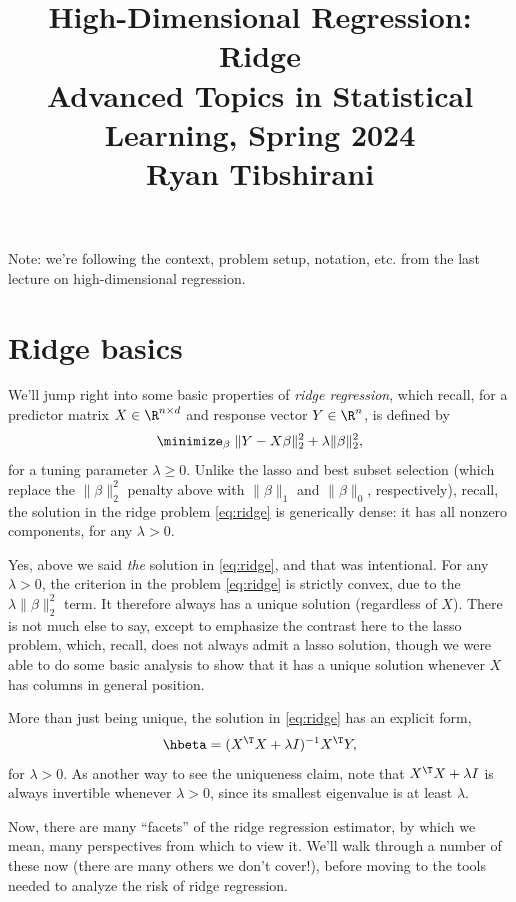 \documentclass{article}
\title{High-Dimensional Regression: Ridge \\ \smallskip
\large Advanced Topics in Statistical Learning, Spring 2024 \\ \smallskip
Ryan Tibshirani}
\date{}
\begin{document}
\maketitle
\RaggedRight
\vspace{-50pt}

Note: we're following the context, problem setup, notation, etc. from the last
lecture on high-dimensional regression.

\section{Ridge basics}

We'll jump right into some basic properties of \emph{ridge regression}, which
recall, for a predictor matrix $X \in \R^{n \times d}$ and response vector $Y
\in \R^n$, is defined by
\begin{equation}
\label{eq:ridge}
\minimize_\beta \; \|Y - X\beta\|_2^2 + \lambda \|\beta\|_2^2, 
\end{equation}
for a tuning parameter $\lambda \geq 0$. Unlike the lasso and best subset
selection (which replace the $\|\beta\|_2^2$ penalty above with $\|\beta\|_1$
and $\|\beta\|_0$, respectively), recall, the solution in the ridge problem
\eqref{eq:ridge} is generically dense: it has all nonzero components, for any
$\lambda > 0$.  

Yes, above we said \emph{the} solution in \eqref{eq:ridge}, and that was 
intentional. For any $\lambda > 0$, the criterion in the problem
\eqref{eq:ridge} is strictly convex, due to the $\lambda \|\beta\|_2^2$ term. It
therefore always has a unique solution (regardless of $X$). There is not much
else to say, except to emphasize the contrast here to the lasso problem, which,
recall, does not always admit a lasso solution, though we were able to do some
basic analysis to show that it has a unique solution whenever $X$ has columns in
general position.      

More than just being unique, the solution in \eqref{eq:ridge} has an explicit
form,
\begin{equation}
\label{eq:ridge_sol}
\hbeta = (X^\T X + \lambda I)^{-1} X^\T Y,
\end{equation}
for $\lambda > 0$. As another way to see the uniqueness claim, note that $X^\T X
+ \lambda I$ is always invertible whenever $\lambda > 0$, since its smallest
eigenvalue is at least $\lambda$. 

Now, there are many ``facets'' of the ridge regression estimator, by which we
mean, many perspectives from which to view it. We'll walk through a number of
these now (there are many others we don't cover!), before moving to the tools
needed to analyze the risk of ridge regression.   
\end{document}
